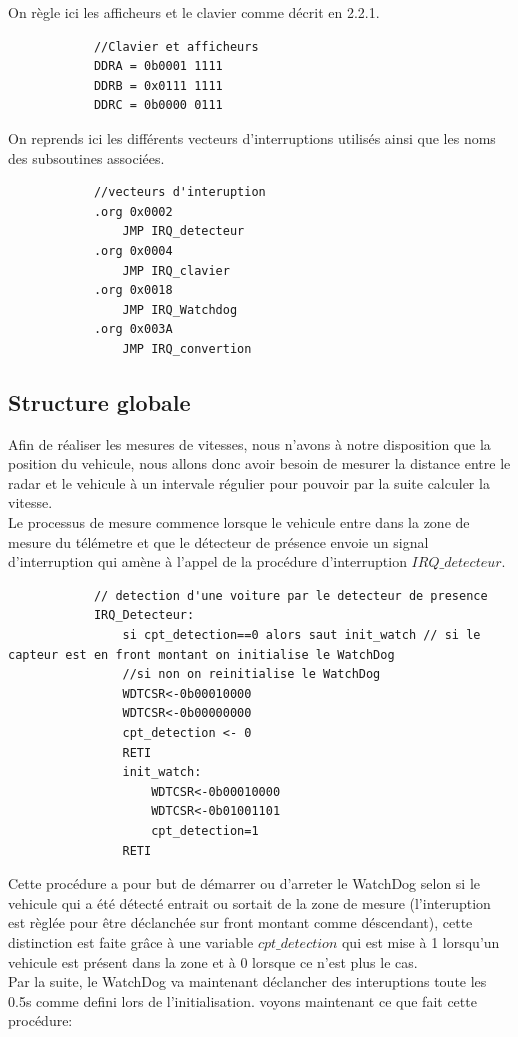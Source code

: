 \documentclass[a4paper, 12pt]{article}
\begin{document}
		On règle ici les afficheurs et le clavier comme décrit en 2.2.1.
		\begin{lstlisting}
			//Clavier et afficheurs
			DDRA = 0b0001 1111
			DDRB = 0x0111 1111
			DDRC = 0b0000 0111
		\end{lstlisting}
		\newpage
		On reprends ici les différents vecteurs d'interruptions utilisés ainsi que les noms des subsoutines associées.
		\begin{lstlisting}
			//vecteurs d'interuption
			.org 0x0002
				JMP IRQ_detecteur
			.org 0x0004
				JMP IRQ_clavier
			.org 0x0018
				JMP IRQ_Watchdog
			.org 0x003A
				JMP IRQ_convertion
		\end{lstlisting}
		\subsection{Structure globale}
		Afin de réaliser les mesures de vitesses, nous n'avons à notre disposition que la position du vehicule, nous allons donc avoir besoin de mesurer la distance entre le radar et le vehicule à un intervale régulier pour pouvoir par la suite calculer la vitesse. \\
		Le processus de mesure commence lorsque le vehicule entre dans la zone de mesure du télémetre et que le détecteur de présence envoie un signal d'interruption qui amène à l'appel de la procédure d'interruption $IRQ\_detecteur$.
		
		\begin{lstlisting}
			// detection d'une voiture par le detecteur de presence  
			IRQ_Detecteur:
				si cpt_detection==0 alors saut init_watch // si le capteur est en front montant on initialise le WatchDog
				//si non on reinitialise le WatchDog 
				WDTCSR<-0b00010000
				WDTCSR<-0b00000000
				cpt_detection <- 0 
				RETI
				init_watch: 
					WDTCSR<-0b00010000
					WDTCSR<-0b01001101
					cpt_detection=1
				RETI
		\end{lstlisting}
		Cette procédure a pour but de démarrer ou d'arreter le WatchDog selon si le vehicule qui a été détecté entrait ou sortait de la zone de mesure (l'interuption est règlée pour être déclanchée sur front montant comme déscendant), cette distinction est faite grâce à une variable $cpt\_detection$ qui est mise à 1 lorsqu'un vehicule est présent dans la zone et à 0 lorsque ce n'est plus le cas.\\
		
		Par la suite, le WatchDog va maintenant déclancher des interuptions toute les 0.5s comme defini lors de l'initialisation. voyons maintenant ce que fait cette procédure:\\
		
\end{document}
